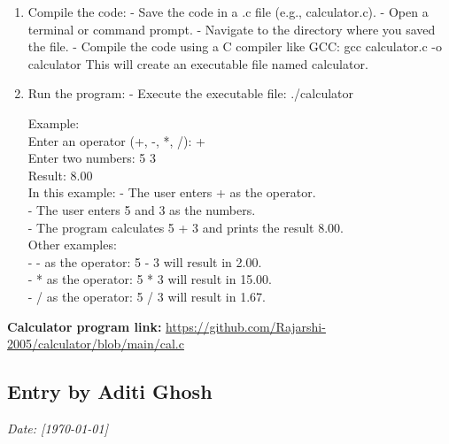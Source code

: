 \documentclass[a4paper,12pt]{article}
\begin{document}
\begin{enumerate}

\item Compile the code:
   - Save the code in a .c file (e.g., calculator.c).
   - Open a terminal or command prompt.
   - Navigate to the directory where you saved the file.
   - Compile the code using a C compiler like GCC:
     gcc calculator.c -o calculator
     This will create an executable file named calculator.\\

\item Run the program:
   - Execute the executable file:
     ./calculator

Example:\\
Enter an operator (+, -, *, /): +\\
Enter two numbers: 5 3\\
Result: 8.00\\

In this example:
- The user enters + as the operator.\\
- The user enters 5 and 3 as the numbers.\\
- The program calculates 5 + 3 and prints the result 8.00.\\

Other examples:\\
- - as the operator: 5 - 3 will result in 2.00.\\
- * as the operator: 5 * 3 will result in 15.00.\\
- / as the operator: 5 / 3 will result in 1.67.\\
\end{enumerate}
\vspace{0.5 cm}

\textbf{Calculator program link:} \href{https://github.com/Rajarshi-2005/calculator/blob/main/cal.c}{https://github.com/Rajarshi-2005/calculator/blob/main/cal.c}



\newpage
{}
\vspace{-2cm}
\subsection*{Entry by Aditi Ghosh}
\textit{Date: [\today]}\\
\end{document}
